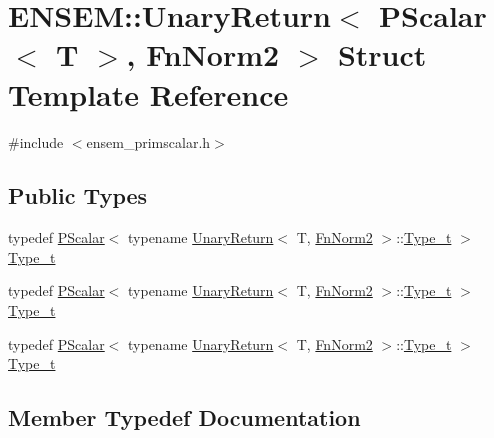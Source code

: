 \hypertarget{structENSEM_1_1UnaryReturn_3_01PScalar_3_01T_01_4_00_01FnNorm2_01_4}{}\section{E\+N\+S\+EM\+:\+:Unary\+Return$<$ P\+Scalar$<$ T $>$, Fn\+Norm2 $>$ Struct Template Reference}
\label{structENSEM_1_1UnaryReturn_3_01PScalar_3_01T_01_4_00_01FnNorm2_01_4}


{\ttfamily \#include $<$ensem\+\_\+primscalar.\+h$>$}

\subsection*{Public Types}
\begin{DoxyCompactItemize}
\item 
typedef \mbox{\hyperlink{classENSEM_1_1PScalar}{P\+Scalar}}$<$ typename \mbox{\hyperlink{structENSEM_1_1UnaryReturn}{Unary\+Return}}$<$ T, \mbox{\hyperlink{structENSEM_1_1FnNorm2}{Fn\+Norm2}} $>$\+::\mbox{\hyperlink{structENSEM_1_1UnaryReturn_3_01PScalar_3_01T_01_4_00_01FnNorm2_01_4_a668c493a2fae41d6416ca55cc046b6b5}{Type\+\_\+t}} $>$ \mbox{\hyperlink{structENSEM_1_1UnaryReturn_3_01PScalar_3_01T_01_4_00_01FnNorm2_01_4_a668c493a2fae41d6416ca55cc046b6b5}{Type\+\_\+t}}
\item 
typedef \mbox{\hyperlink{classENSEM_1_1PScalar}{P\+Scalar}}$<$ typename \mbox{\hyperlink{structENSEM_1_1UnaryReturn}{Unary\+Return}}$<$ T, \mbox{\hyperlink{structENSEM_1_1FnNorm2}{Fn\+Norm2}} $>$\+::\mbox{\hyperlink{structENSEM_1_1UnaryReturn_3_01PScalar_3_01T_01_4_00_01FnNorm2_01_4_a668c493a2fae41d6416ca55cc046b6b5}{Type\+\_\+t}} $>$ \mbox{\hyperlink{structENSEM_1_1UnaryReturn_3_01PScalar_3_01T_01_4_00_01FnNorm2_01_4_a668c493a2fae41d6416ca55cc046b6b5}{Type\+\_\+t}}
\item 
typedef \mbox{\hyperlink{classENSEM_1_1PScalar}{P\+Scalar}}$<$ typename \mbox{\hyperlink{structENSEM_1_1UnaryReturn}{Unary\+Return}}$<$ T, \mbox{\hyperlink{structENSEM_1_1FnNorm2}{Fn\+Norm2}} $>$\+::\mbox{\hyperlink{structENSEM_1_1UnaryReturn_3_01PScalar_3_01T_01_4_00_01FnNorm2_01_4_a668c493a2fae41d6416ca55cc046b6b5}{Type\+\_\+t}} $>$ \mbox{\hyperlink{structENSEM_1_1UnaryReturn_3_01PScalar_3_01T_01_4_00_01FnNorm2_01_4_a668c493a2fae41d6416ca55cc046b6b5}{Type\+\_\+t}}
\end{DoxyCompactItemize}


\subsection{Member Typedef Documentation}
\mbox{\label{structENSEM_1_1UnaryReturn_3_01PScalar_3_01T_01_4_00_01FnNorm2_01_4_a668c493a2fae41d6416ca55cc046b6b5}} 

